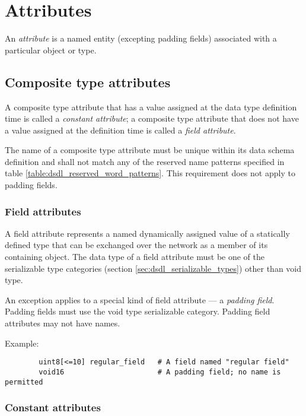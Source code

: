 \section{Attributes}\label{sec:dsdl_attributes}

An \emph{attribute} is a named entity (excepting padding fields) associated with a particular object or type.

\subsection{Composite type attributes}

A composite type attribute that has a value assigned at the data type definition time is called a
\emph{constant attribute};
a composite type attribute that does not have a value assigned at the definition time is called a
\emph{field attribute}.

The name of a composite type attribute must be unique within its data schema definition
and shall not match any of the reserved name patterns specified in table
\ref{table:dsdl_reserved_word_patterns}.
This requirement does not apply to padding fields.

\subsubsection{Field attributes}

A field attribute represents a named dynamically assigned value of a statically defined type
that can be exchanged over the network as a member of its containing object.
The data type of a field attribute must be one of the serializable type categories
(section \ref{sec:dsdl_serializable_types})
other than void type.

An exception applies to a special kind of field attribute --- a \emph{padding field}.
Padding fields must use the void type serializable category. Padding field attributes may not have names.

\begin{remark}
    Example:
    \begin{verbatim}
        uint8[<=10] regular_field   # A field named "regular field"
        void16                      # A padding field; no name is permitted
    \end{verbatim}
\end{remark}

\subsubsection{Constant attributes}


